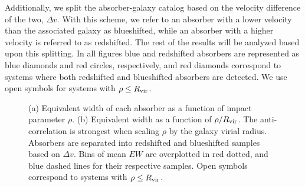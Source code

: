 Additionally, we split the absorber-galaxy catalog based on the velocity difference of the two, $\Delta v$. With this scheme, we refer to an absorber with a lower velocity than the associated galaxy as blueshifted, while an absorber with a higher velocity is referred to as redshifted. The rest of the results will be analyzed based upon this splitting. In all figures blue and redshifted absorbers are represented as blue diamonds and red circles, respectively, and red diamonds correspond to systems where both redshifted and blueshifted absorbers are detected. We use open symbols for systems with $\rho \leq R_{\rm vir}$.


\begin{figure}[ht]
\centering
{}
\caption{\small{(a) Equivalent width of each absorber as a function of impact parameter $\rho$. (b) Equivalent width as a function of $\rho/R_{\rm vir}$. The anti-correlation is strongest when scaling $\rho$ by the galaxy virial radius. Absorbers are separated into redshifted and blueshifted samples based on $\Delta v$. Bins of mean $EW$ are overplotted in red dotted, and blue dashed lines for their respective samples. Open symbols correspond to systems with $\rho \leq R_{\rm vir}$.}}
\vspace{5pt}
\end{figure}



